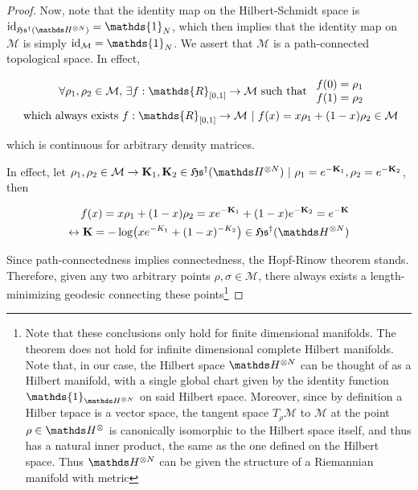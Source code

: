 \documentclass{homework}
\begin{document}
\begin{proof}
Now, note that the identity map on the Hilbert-Schmidt space is $\textnormal{id}_{\mathfrak{H}\mathfrak{s}^{\dagger}(\hilbert^{\otimes N})} = \mathds{1}_{N}$, which then implies that the identity map on $\mathcal{M}$ is simply $\textnormal{id}_{\mathcal{M}} = \mathds{1}_N$. We assert that $\mathcal{M}$ is a path-connected topological space. In effect, 

\begin{align*}
\forall \rho_1, \rho_2 \in \mathcal{M}, & \blanky \exists f:\mathds{R}_{[0,1]} \rightarrow \mathcal{M} \textnormal{ such that } \begin{array}{c}
        f(0) = \rho_1 \\
        f(1) = \rho_2
    \end{array} \\
    \textnormal{ which always exists } 
    &f:\mathds{R}_{[0,1]} \rightarrow \mathcal{M} \blanky | \blanky f(x) = x \rho_1 + (1-x) \rho_2 \in \mathcal{M}
\end{align*}

which is continuous for arbitrary density matrices.

\begin{tcolorbox}[title = Proof: Path-connectedness in the finite-dimensional case.]
In effect, let $\rho_1, \rho_2 \in \mathcal{M} \rightarrow {{\bf K}}_1, {{\bf K}}_2 \in \mathfrak{H}\mathfrak{s}^{\dagger}(\hilbert^{\otimes N}) \blanky | \blanky \rho_1 = e^{-{\bf K}_1},  \rho_2 = e^{-{\bf K}_2}$, then

\begin{equation}
    \begin{split}
        f(x) = x \rho_1 + (1-x) \rho_2  = x e^{-{\bf K}_1} + (1-x) e^{-{\bf K}_2} = e^{-{\bf K}} \\
        \leftrightarrow {\bf K} = - \log (x e^{-K_1} + (1-x) ^{-K_2}) \in \mathfrak{H}\mathfrak{s}^{\dagger}(\hilbert^{\otimes N}) \\
    \end{split}
\end{equation}
\end{tcolorbox}

Since path-connectedness implies connectedness, the Hopf-Rinow theorem stands. Therefore, given any two arbitrary points $\rho, \sigma \in \mathcal{M}$, there always exists a length-minimizing geodesic connecting these points\footnote{Note that these conclusions only hold for finite dimensional manifolds. The theorem does not hold for infinite dimensional complete Hilbert manifolds. Note that, in our case, the Hilbert space $\hilbert^{\otimes N}$ can be thought of as a Hilbert manifold, with a single global chart given by the identity function $\mathds{1}_{\hilbert^{\otimes N}}$ on said Hilbert space. Moreover, since by definition a Hilber tspace is a vector space, the tangent space $T_{\rho} \mathcal{M}$ to $\mathcal{M}$ at the point $\rho \in \hilbert^{\otimes}$ is canonically isomorphic to the Hilbert space itself, and thus has a natural inner product, the same as the one defined on the Hilbert space. Thus $\hilbert^{\otimes N}$ can be given the structure of a Riemannian manifold with metric 

}
\end{proof}
\end{document}
